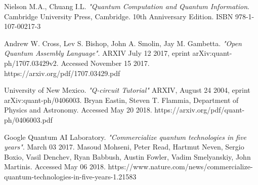 \documentclass[a4paper]{article}
\begin{document}
\newpage
%


\begin{thebibliography}{9}
	\label{sec:bibliography} %



	Nielson M.A., Chuang I.L. \emph{"Quantum Computation and Quantum Information}. Cambridge University Press, Cambridge. 10th Anniversary Edition. ISBN 978-1-107-00217-3

	Andrew W. Cross, Lev S. Bishop, John A. Smolin, Jay M. Gambetta. \emph{"Open Quantum Assembly Language"}. ARXIV July 12 2017, eprint arXiv:quant-ph/1707.03429v2. Accessed November 15 2017. https://arxiv.org/pdf/1707.03429.pdf

	University of New Mexico. \emph{"Q-circuit Tutorial"} ARXIV, August 24 2004, eprint arXiv:quant-ph/0406003. Bryan Eastin, Steven T. Flammia, Department of Physics and Astronomy. Accessed May 20 2018. https://arxiv.org/pdf/quant-ph/0406003.pdf 

	Google Quantum AI Laboratory. \emph{"Commercialize quantum technologies in five years"}. March 03 2017. Masoud Mohseni, Peter Read, Hartmut Neven, Sergio Boxio, Vasil Denchev, Ryan Babbush, Austin Fowler, Vadim Smelyanskiy, John Martinis.  Accessed May 06 2018.  https://www.nature.com/news/commercialize-quantum-technologies-in-five-years-1.21583


\end{thebibliography}
\end{document}
